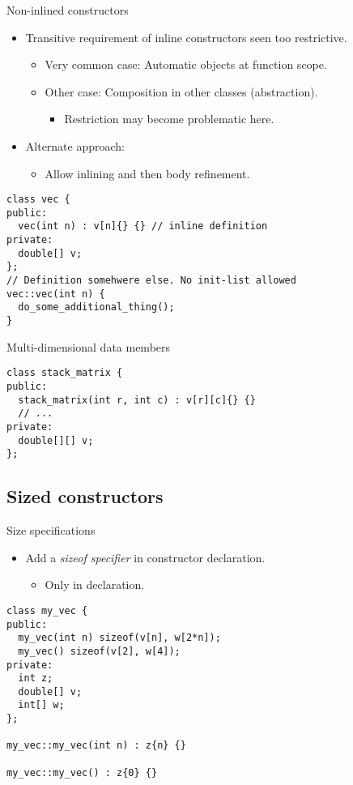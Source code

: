 \begin{frame}[t,fragile]{Non-inlined constructors}
  \begin{itemize}
    \item Transitive requirement of inline constructors seen too restrictive.
      \begin{itemize}
        \item Very common case: Automatic objects at function scope.
        \item Other case: Composition in other classes (abstraction).
          \begin{itemize}
            \item Restriction may become problematic here.
          \end{itemize}
      \end{itemize}
    \pause
    \item Alternate approach:
      \begin{itemize}
        \item Allow inlining and then body refinement.
      \end{itemize}
  \end{itemize}
\begin{lstlisting}[style=cpp11]
class vec {
public:
  vec(int n) : v[n]{} {} // inline definition
private:
  double[] v;
};
// Definition somehwere else. No init-list allowed
vec::vec(int n) {
  do_some_additional_thing();
}
\end{lstlisting}
\end{frame}

\begin{frame}[t,fragile]{Multi-dimensional data members}
\begin{lstlisting}[style=cpp11]
class stack_matrix {
public:
  stack_matrix(int r, int c) : v[r][c]{} {}
  // ...
private:
  double[][] v;
};
\end{lstlisting}
\end{frame}

\subsection{Sized constructors}

\begin{frame}[t,fragile]{Size specifications}
  \begin{itemize}
    \item Add a \emph{sizeof specifier} in constructor declaration.
      \begin{itemize}
        \item Only in declaration.
      \end{itemize}
  \end{itemize}
\begin{lstlisting}[style=cpp11]
class my_vec {
public:
  my_vec(int n) sizeof(v[n], w[2*n]);
  my_vec() sizeof(v[2], w[4]);
private:
  int z;
  double[] v;
  int[] w;
};

my_vec::my_vec(int n) : z{n} {}

my_vec::my_vec() : z{0} {}
\end{lstlisting}
\end{frame}


